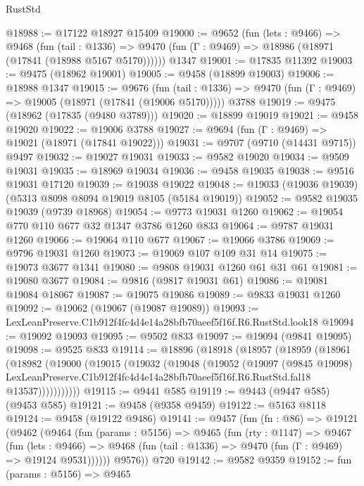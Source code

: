 \begin{lexlean}{RustStd}
\begin{coremodule}
@18988 := @17122 @18927 @15409
@19000 := @9652
    (fun (lets : @9466) =>
    @9468
      (fun (tail : @1336) =>
      @9470 (fun (Γ : @9469) => @18986 (@18971 (@17841 (@18988 @5167 @5170))))))
    @1347
@19001 := @17835 @11392
@19003 := @9475 (@18962 @19001)
@19005 := @9458 (@18899 @19003)
@19006 := @18988 @1347
@19015 := @9676
    (fun (tail : @1336) => @9470 (fun (Γ : @9469) => @19005 (@18971 (@17841 (@19006 @5170)))))
    @3788
@19019 := @9475 (@18962 (@17835 (@9480 @3789)))
@19020 := @18899 @19019
@19021 := @9458 @19020
@19022 := @19006 @3788
@19027 := @9694 (fun (Γ : @9469) => @19021 (@18971 (@17841 @19022)))
@19031 := @9707 (@9710 (@14431 @9715)) @9497
@19032 := @19027 @19031
@19033 := @9582 @19020
@19034 := @9509 @19031
@19035 := @18969 @19034
@19036 := @9458 @19035
@19038 := @9516 @19031 @17120
@19039 := @19038 @19022
@19048 := @19033 (@19036 @19039) (@5313 @8098 @8094 @19019 @8105 (@5184 @19019))
@19052 := @9582 @19035 @19039 (@9739 @18968)
@19054 := @9773 @19031 @1260
@19062 := @19054 @770 @110 @677 @32 @1347 @3786 @1260 @833
@19064 := @9787 @19031 @1260
@19066 := @19064 @110 @677
@19067 := @19066 @3786
@19069 := @9796 @19031 @1260
@19073 := @19069 @107 @109 @31 @14
@19075 := @19073 @3677 @1341
@19080 := @9808 @19031 @1260 @61 @31 @61
@19081 := @19080 @3677
@19084 := @9816 (@9817 @19031 @61)
@19086 := @19081 @19084 @18067
@19087 := @19075 @19086
@19089 := @9833 @19031 @1260
@19092 := @19062 (@19067 (@19087 @19089))
@19093 := LexLeanPreserve.C1b912f4fc4d4e14a28bfb70aeef5f16f.R6.RustStd.look18
@19094 := @19092 @19093
@19095 := @9502 @833
@19097 := @19094 (@9841 @19095)
@19098 := @9525 @833
@19114 := @18896
    (@18918
      (@18957
        (@18959
          (@18961
            (@18982
              (@19000
                (@19015
                  (@19032
                    (@19048
                      (@19052
                        (@19097
                          (@9845 @19098)
                          LexLeanPreserve.C1b912f4fc4d4e14a28bfb70aeef5f16f.R6.RustStd.fal18
                          @13537)))))))))))
@19115 := @9441 @585
@19119 := @9443 (@9447 @585) (@9453 @585)
@19121 := @9458 (@9358 @9459)
@19122 := @5163 @8118
@19124 := @9458 (@19122 @9486)
@19141 := @9457
    (fun (fn : @86) =>
    @19121
      (@9462
        (@9464
          (fun (params : @5156) =>
          @9465
            (fun (rty : @1147) =>
            @9467
              (fun (lets : @9466) =>
              @9468 (fun (tail : @1336) => @9470 (fun (Γ : @9469) => @19124 @9531))))))
        @9576))
    @720
@19142 := @9582 @9359
@19152 := fun (params : @5156) =>
  @9465

\end{coremodule}
\end{lexlean}
